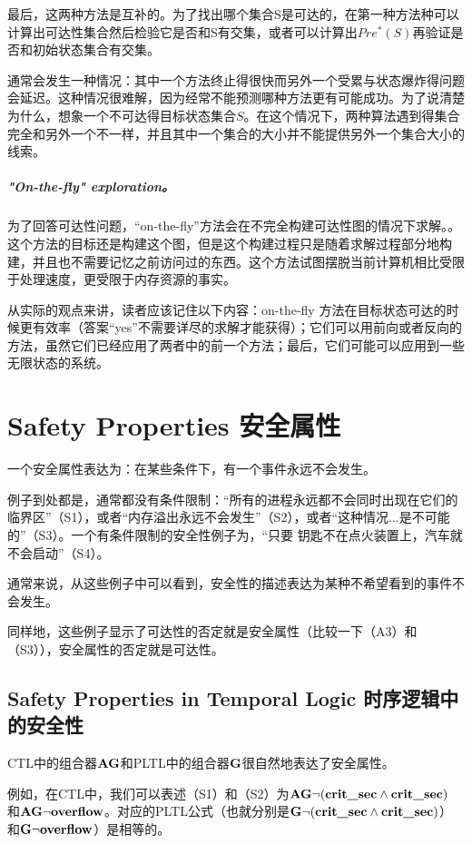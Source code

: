 \documentclass{book}
\begin{document}
    最后，这两种方法是互补的。为了找出哪个集合S是可达的，在第一种方法种可以计算出可达性集合然后检验它是否和S有交集，或者可以计算出$Pre^*(S)$再验证是否和初始状态集合有交集。

    通常会发生一种情况：其中一个方法终止得很快而另外一个受累与状态爆炸得问题会延迟。这种情况很难解，因为经常不能预测哪种方法更有可能成功。为了说清楚为什么，想象一个不可达得目标状态集合$S$。在这个情况下，两种算法遇到得集合完全和另外一个不一样，并且其中一个集合的大小并不能提供另外一个集合大小的线索。

    \paragraph{"On-the-fly" exploration。}为了回答可达性问题，“on-the-fly”方法会在不完全构建可达性图的情况下求解。。这个方法的目标还是构建这个图，但是这个构建过程只是随着求解过程部分地构建，并且也不需要记忆之前访问过的东西。这个方法试图摆脱当前计算机相比受限于处理速度，更受限于内存资源的事实。

    从实际的观点来讲，读者应该记住以下内容：on-the-fly 方法在目标状态可达的时候更有效率（答案“yes”不需要详尽的求解才能获得）；它们可以用前向或者反向的方法，虽然它们已经应用了两者中的前一个方法；最后，它们可能可以应用到一些无限状态的系统。

    \chapter{Safety Properties 安全属性}
    一个安全属性表达为：在某些条件下，有一个事件永远不会发生。

    例子到处都是，通常都没有条件限制：“所有的进程永远都不会同时出现在它们的临界区”（S1），或者“内存溢出永远不会发生”（S2），或者“这种情况...是不可能的”（S3）。一个有条件限制的安全性例子为，“只要 钥匙不在点火装置上，汽车就不会启动”（S4）。

    通常来说，从这些例子中可以看到，安全性的描述表达为某种不希望看到的事件不会发生。

    同样地，这些例子显示了可达性的否定就是安全属性（比较一下（A3）和（S3）），安全属性的否定就是可达性。

    \section{Safety Properties in Temporal Logic 时序逻辑中的安全性}
    CTL中的组合器$\text{\textbf{AG}}$和PLTL中的组合器$\text{\textbf{G}}$很自然地表达了安全属性。

    例如，在CTL中，我们可以表述（S1）和（S2）为$\text{\textbf{AG}}\neg(\text{\textbf{crit\_sec}}\wedge\text{\textbf{crit\_sec}})$
    和$\text{\textbf{AG}}\neg\text{\textbf{overflow}}$。对应的PLTL公式（也就分别是$\text{\textbf{G}}\neg(\text{\textbf{crit\_sec}}\wedge\text{\textbf{crit\_sec}})$）
    和$\text{\textbf{G}}\neg\text{\textbf{overflow}}$）是相等的。
\end{document}
